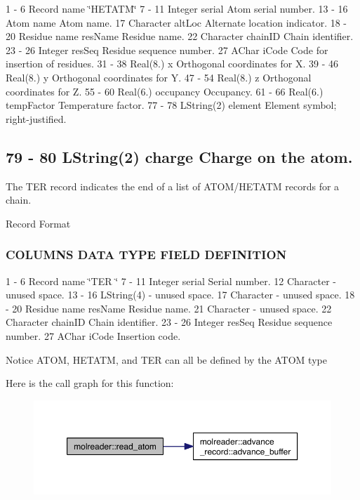 1 -\/ 6 Record name \char`\"{}\-H\-E\-T\-A\-T\-M\char`\"{} 7 -\/ 11 Integer serial Atom serial number. 13 -\/ 16 Atom name Atom name. 17 Character alt\-Loc Alternate location indicator. 18 -\/ 20 Residue name res\-Name Residue name. 22 Character chain\-I\-D Chain identifier. 23 -\/ 26 Integer res\-Seq Residue sequence number. 27 A\-Char i\-Code Code for insertion of residues. 31 -\/ 38 Real(8.) x Orthogonal coordinates for X. 39 -\/ 46 Real(8.) y Orthogonal coordinates for Y. 47 -\/ 54 Real(8.) z Orthogonal coordinates for Z. 55 -\/ 60 Real(6.) occupancy Occupancy. 61 -\/ 66 Real(6.) temp\-Factor Temperature factor. 77 -\/ 78 L\-String(2) element Element symbol; right-\/justified. \subsection*{79 -\/ 80 L\-String(2) charge Charge on the atom.}

The T\-E\-R record indicates the end of a list of A\-T\-O\-M/\-H\-E\-T\-A\-T\-M records for a chain.

Record Format

\subsubsection*{C\-O\-L\-U\-M\-N\-S D\-A\-T\-A T\-Y\-P\-E F\-I\-E\-L\-D D\-E\-F\-I\-N\-I\-T\-I\-O\-N}

1 -\/ 6 Record name \char`\"{}\-T\-E\-R   \char`\"{} 7 -\/ 11 Integer serial Serial number. 12 Character -\/ unused space. 13 -\/ 16 L\-String(4) -\/ unused space. 17 Character -\/ unused space. 18 -\/ 20 Residue name res\-Name Residue name. 21 Character -\/ unused space. 22 Character chain\-I\-D Chain identifier. 23 -\/ 26 Integer res\-Seq Residue sequence number. 27 A\-Char i\-Code Insertion code.

Notice A\-T\-O\-M, H\-E\-T\-A\-T\-M, and T\-E\-R can all be defined by the A\-T\-O\-M type 

Here is the call graph for this function\-:
\nopagebreak
\begin{figure}[H]
\begin{center}
\leavevmode
\includegraphics[width=350pt]{classmolreader_a49ccaf345b633e27f69ad7a5a8637a2a_cgraph}
\end{center}
\end{figure}


